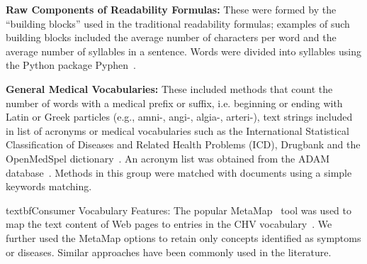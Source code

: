 \textbf{Raw Components of Readability Formulas:}
These were formed by the ``building blocks'' used in the traditional readability formulas; examples of such building blocks included the average number of characters per word and the average number of syllables in a sentence. Words were divided into syllables using the Python package Pyphen~\cite{pyphen}.




\textbf{General Medical Vocabularies:}
These included methods that count the number of words with a medical prefix or suffix, i.e. beginning or ending with Latin or Greek particles (e.g., amni-, angi-, algia-, arteri-), text strings included in list of acronyms or medical vocabularies such as the International Statistical Classification of Diseases and Related Health Problems (ICD), Drugbank and the OpenMedSpel dictionary~\cite{openmedspel}. An acronym list was obtained from the ADAM database~\cite{zhou2006}. Methods in this group were matched with documents using a simple keywords matching.






textbf{Consumer Vocabulary Features:}
The popular MetaMap~\cite{aronson10} tool was used to map the text content of Web pages to entries in the CHV vocabulary~\cite{zeng06}.
We further used the MetaMap options to retain only concepts identified as symptoms or diseases. Similar approaches have been commonly used in the literature\todo{~\cite{}}.



